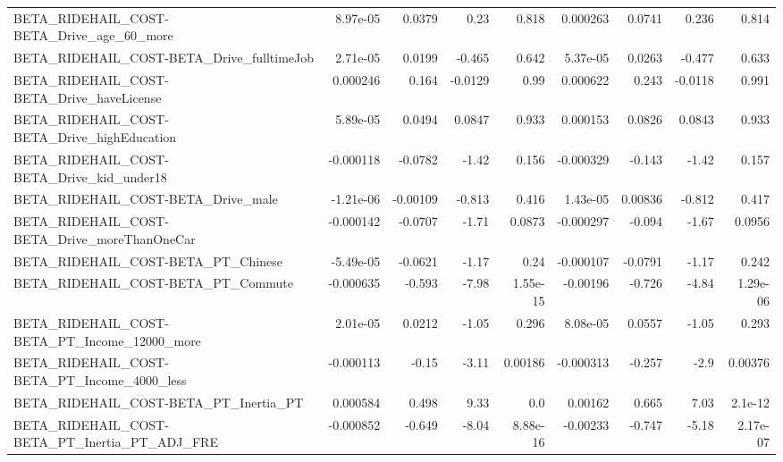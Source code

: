 \begin{tabular}{lrrrrrrrr}
BETA\_RIDEHAIL\_COST-BETA\_Drive\_age\_60\_more          &    8.97e-05 &       0.0379 &     0.23 &    0.818 &   0.000263 &      0.0741 &        0.236 &         0.814 \\
BETA\_RIDEHAIL\_COST-BETA\_Drive\_fulltimeJob          &    2.71e-05 &       0.0199 &   -0.465 &    0.642 &   5.37e-05 &      0.0263 &       -0.477 &         0.633 \\
BETA\_RIDEHAIL\_COST-BETA\_Drive\_haveLicense          &    0.000246 &        0.164 &  -0.0129 &     0.99 &   0.000622 &       0.243 &      -0.0118 &         0.991 \\
BETA\_RIDEHAIL\_COST-BETA\_Drive\_highEducation        &    5.89e-05 &       0.0494 &   0.0847 &    0.933 &   0.000153 &      0.0826 &       0.0843 &         0.933 \\
BETA\_RIDEHAIL\_COST-BETA\_Drive\_kid\_under18          &   -0.000118 &      -0.0782 &    -1.42 &    0.156 &  -0.000329 &      -0.143 &        -1.42 &         0.157 \\
BETA\_RIDEHAIL\_COST-BETA\_Drive\_male                 &   -1.21e-06 &     -0.00109 &   -0.813 &    0.416 &   1.43e-05 &     0.00836 &       -0.812 &         0.417 \\
BETA\_RIDEHAIL\_COST-BETA\_Drive\_moreThanOneCar       &   -0.000142 &      -0.0707 &    -1.71 &   0.0873 &  -0.000297 &      -0.094 &        -1.67 &        0.0956 \\
BETA\_RIDEHAIL\_COST-BETA\_PT\_Chinese                 &   -5.49e-05 &      -0.0621 &    -1.17 &     0.24 &  -0.000107 &     -0.0791 &        -1.17 &         0.242 \\
BETA\_RIDEHAIL\_COST-BETA\_PT\_Commute                 &   -0.000635 &       -0.593 &    -7.98 & 1.55e-15 &   -0.00196 &      -0.726 &        -4.84 &      1.29e-06 \\
BETA\_RIDEHAIL\_COST-BETA\_PT\_Income\_12000\_more       &    2.01e-05 &       0.0212 &    -1.05 &    0.296 &   8.08e-05 &      0.0557 &        -1.05 &         0.293 \\
BETA\_RIDEHAIL\_COST-BETA\_PT\_Income\_4000\_less        &   -0.000113 &        -0.15 &    -3.11 &  0.00186 &  -0.000313 &      -0.257 &         -2.9 &       0.00376 \\
BETA\_RIDEHAIL\_COST-BETA\_PT\_Inertia\_PT              &    0.000584 &        0.498 &     9.33 &      0.0 &    0.00162 &       0.665 &         7.03 &       2.1e-12 \\
BETA\_RIDEHAIL\_COST-BETA\_PT\_Inertia\_PT\_ADJ\_FRE      &   -0.000852 &       -0.649 &    -8.04 & 8.88e-16 &   -0.00233 &      -0.747 &        -5.18 &      2.17e-07 \\

\end{tabular}
